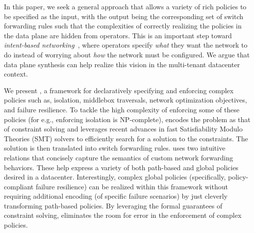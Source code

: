 

In this paper, we seek a general approach that allows a variety
of rich policies to be specified as the input, with the output being
the corresponding set of switch forwarding rules such that the
complexities of correctly realizing the policies in the data plane are
hidden from operators. This is an important step toward {\em
  intent-based networking}~\cite{intent}, where operators specify {\em
  what} they want the network to do instead of worrying about {\em
  how} the network must be configured.
We argue that data plane synthesis can help 
realize this vision in the multi-tenant datacenter
context.

We present \Name, a framework for declaratively specifying and
enforcing complex policies such as, isolation, middlebox traversals,
network optimization objectives, and failure resilience. To tackle the
high complexity of enforcing some of these policies (for e.g.,
enforcing isolation is NP-complete), \Name encodes the problem as that
of constraint solving and leverages recent advances in fast
Satisfiability Modulo Theories (SMT) solvers to efficiently search for
a solution to the constraints. The solution is then translated into
switch forwarding rules. \Name uses two intuitive relations that
concisely capture the semantics of custom network forwarding
behaviors. These help express a variety of both path-based and global
policies desired in a datacenter. Interestingly, complex global policies (specifically,
policy-compliant failure resilience) can be realized within this
framework without requiring additional encoding (of specific failure
scenarios) by just cleverly transforming path-based policies.
By leveraging the formal guarantees of constraint solving, \Name
eliminates the room for error in the enforcement of complex
policies.

